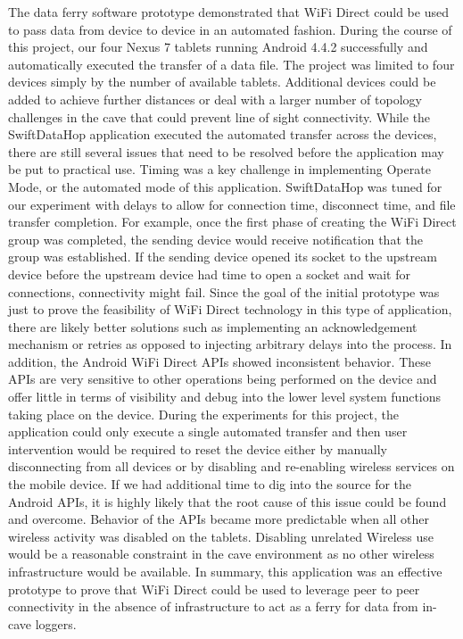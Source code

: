 \documentclass[10pt,twocolumn]{article}
\begin{document}
The data ferry software prototype demonstrated that WiFi Direct could be used to pass data from device to device in an automated fashion. 
During the course of this project, our four Nexus 7 tablets running Android 4.4.2 successfully and automatically executed the transfer of a data file.
The project was limited to four devices simply by the number of available tablets.
Additional devices could be added to achieve further distances or deal with a larger number of topology challenges in the cave that could prevent line of sight connectivity. 
While the SwiftDataHop application executed the automated transfer across the devices, there are still several issues that need to be resolved before the application may be put to practical use.
Timing was a key challenge in implementing Operate Mode, or the automated mode of this application.
SwiftDataHop was tuned for our experiment with delays to allow for connection time, disconnect time, and file transfer completion.
For example, once the first phase of creating the WiFi Direct group was completed, the sending device would receive notification that the group was established.  
If the sending device opened its socket to the upstream device before the upstream device had time to open a socket and wait for connections, connectivity might fail.
Since the goal of the initial prototype was just to prove the feasibility of WiFi Direct technology in this type of application, there are likely better solutions such as implementing an acknowledgement mechanism or retries as opposed to injecting arbitrary delays into the process. 
In addition, the Android WiFi Direct APIs showed inconsistent behavior.
These APIs are very sensitive to other operations being performed on the device and offer little in terms of visibility and debug into the lower level system functions taking place on the device.
During the experiments for this project, the application could only execute a single automated transfer and then user intervention would be required to reset the device either by manually disconnecting from all devices or by disabling and re-enabling wireless services on the mobile device.
If we had additional time to dig into the source for the Android APIs, it is highly likely that the root cause of this issue could be found and overcome.
Behavior of the APIs became more predictable when all other wireless activity was disabled on the tablets.
Disabling unrelated Wireless use would be a reasonable constraint in the cave environment as no other wireless infrastructure would be available.
In summary, this application was an effective prototype to prove that WiFi Direct could be used to leverage peer to peer connectivity in the absence of infrastructure to act as a ferry for data from in-cave loggers.
\end{document}

